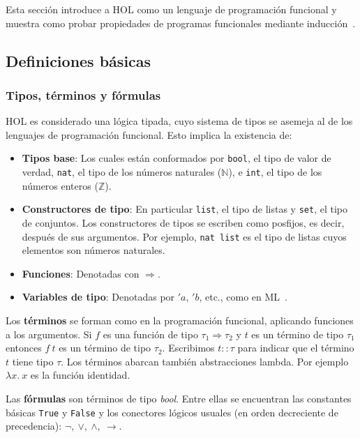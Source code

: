 \documentclass[12pt]{book}
\begin{document}
Esta sección introduce a HOL como un lenguaje de programación funcional y muestra como probar propiedades de programas funcionales mediante inducción~\cite{prog-prove-isabelle}.

\subsection{Definiciones básicas}

\subsubsection{Tipos, términos y fórmulas}

HOL es considerado una lógica tipada, cuyo sistema de tipos se asemeja al de los lenguajes de programación funcional. Esto implica la existencia de:

\begin{itemize}
	\item \textbf{Tipos base}: Los cuales están conformados por \texttt{bool}, el tipo de valor de verdad, \texttt{nat}, el tipo de los números naturales ($\mathbb{N}$), e \texttt{int}, el tipo de los números enteros ($\mathbb{Z}$).
 	\item \textbf{Constructores de tipo}: En particular \texttt{list}, el tipo de listas y \texttt{set}, el tipo de conjuntos. Los constructores de tipos se escriben como posfijos, es decir, después de sus argumentos. Por ejemplo, \texttt{nat list} es el tipo de listas cuyos elementos son números naturales.
  	\item \textbf{Funciones}: Denotadas con $\Rightarrow$.
  	\item \textbf{Variables de tipo}: Denotadas por $'a$, $'b$, etc., como en ML~\cite{ML_programming_language}.
\end{itemize}

Los \textbf{términos} se forman como en la programación funcional, aplicando funciones a los argumentos. Si $f$ es una función de tipo $\tau_1 \Rightarrow \tau_2$ y $t$ es un término de tipo $\tau_1$ entonces $f\ t$ es un término de tipo $\tau_2$. Escribimos $t :: \tau$ para indicar que el término $t$ tiene tipo $\tau$. Los términos abarcan también abstracciones lambda. Por ejemplo $\lambda x.\ x$ es la función identidad.

Las \textbf{fórmulas} son términos de tipo \textit{bool}. Entre ellas se encuentran las constantes básicas \texttt{True} y \texttt{False} y los conectores lógicos usuales (en orden decreciente de precedencia): $\neg,\ \vee,\ \wedge,\ \rightarrow$.
\end{document}
